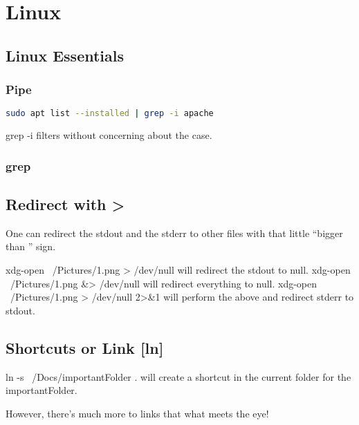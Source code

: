 


\section{Linux }


\subsection{Linux Essentials}


\subsubsection{Pipe}

\begin{lstlisting}[language=bash]
    sudo apt list --installed | grep -i apache
\end{lstlisting}
grep -i filters without concerning about the case.


\subsubsection{grep}

\subsection{Redirect with >}
One can redirect the stdout and the stderr to other files with that little ``bigger than '' sign.

xdg-open ~/Pictures/1.png > /dev/null will redirect the stdout to null. 
xdg-open ~/Pictures/1.png &> /dev/null will redirect everything to null.
xdg-open ~/Pictures/1.png > /dev/null 2>&1 will perform the above and redirect stderr to stdout.


\subsection{Shortcuts or Link [ln]}
ln -s ~/Docs/importantFolder .
will create a shortcut in the current folder for the importantFolder.

However, there's much more to links that what meets the eye!

\begin{center}
\end{center}

